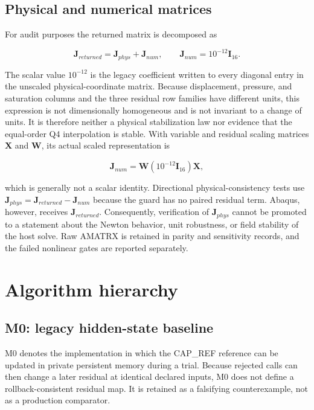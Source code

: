 \documentclass[preprint,12pt,authoryear]{elsarticle}
\begin{document}
\subsection{Physical and numerical matrices}

For audit purposes the returned matrix is decomposed as

\begin{equation}
\mathbf{J}_{returned}=\mathbf{J}_{phys}+\mathbf{J}_{num},
\qquad \mathbf{J}_{num}=10^{-12}\mathbf{I}_{16}.
\end{equation}

The scalar value $10^{-12}$ is the legacy coefficient written to every diagonal entry in the unscaled physical-coordinate matrix. Because displacement, pressure, and saturation columns and the three residual row families have different units, this expression is not dimensionally homogeneous and is not invariant to a change of units. It is therefore neither a physical stabilization law nor evidence that the equal-order Q4 interpolation is stable. With variable and residual scaling matrices $\mathbf{X}$ and $\mathbf{W}$, its actual scaled representation is

\begin{equation}
\widehat{\mathbf{J}}_{num}=\mathbf{W}(10^{-12}\mathbf{I}_{16})\mathbf{X},
\end{equation}

which is generally not a scalar identity. Directional physical-consistency tests use
$\mathbf{J}_{phys}=\mathbf{J}_{returned}-\mathbf{J}_{num}$ because the guard has no paired residual term. Abaqus, however, receives $\mathbf{J}_{returned}$. Consequently, verification of $\mathbf{J}_{phys}$ cannot be promoted to a statement about the Newton behavior, unit robustness, or field stability of the host solve. Raw AMATRX is retained in parity and sensitivity records, and the failed nonlinear gates are reported separately.

\section{Algorithm hierarchy}

\subsection{M0: legacy hidden-state baseline}

M0 denotes the implementation in which the CAP\_\allowbreak{}REF reference can be updated in private persistent memory during a trial. Because rejected calls can then change a later residual at identical declared inputs, M0 does not define a rollback-consistent residual map. It is retained as a falsifying counterexample, not as a production comparator.
\end{document}
